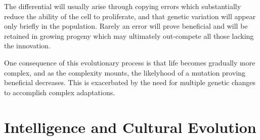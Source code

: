 {The differential will usually arise through copying errors which substantially reduce the ability of the cell to proliferate, and that genetic variation will appear only briefly in the population.
Rarely an error will prove beneficial and will be retained in growing progeny which may ultimately out-compete all those lacking the innovation.

One consequence of this evolutionary process is that life becomes gradually more complex, and as the complexity mounts, the likelyhood of a mutation proving beneficial decreases.
This is exacerbated by the need for multiple genetic changes to accomplish complex adaptations.





\section{Intelligence and Cultural Evolution}
}%
